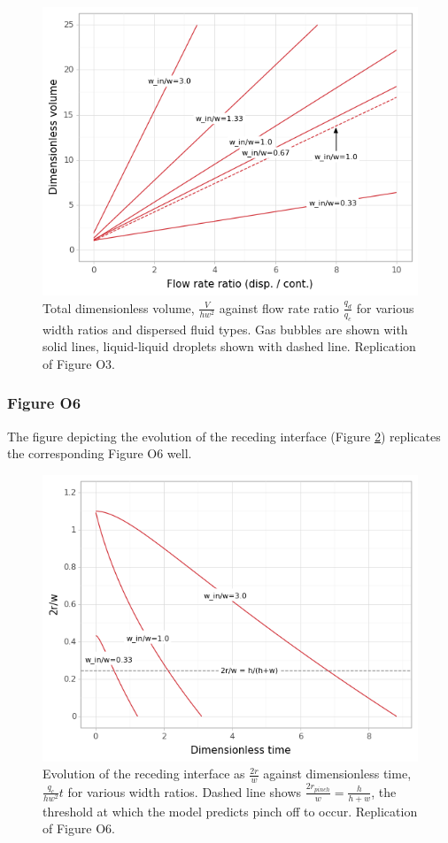 \begin{figure}[ht]
  \centering
  \includegraphics[width=0.8\linewidth]{../figures/fig_3.png}
  \caption{Total dimensionless volume, $\frac{V}{hw^2}$ against flow rate ratio $\frac{q_d}{q_c}$
  for various width ratios and dispersed fluid types. Gas bubbles are shown with solid lines, liquid-liquid droplets
  shown with dashed line. Replication of Figure O3.}
  \label{fig3}
\end{figure}

\subsubsection{Figure O6}

The figure depicting the evolution of the receding interface (Figure \ref{fig6}) replicates
the corresponding Figure O6 well.

\begin{figure}[!htb]
  \centering
  \includegraphics[width=0.8\linewidth]{../figures/fig_6.png}
  \caption{Evolution of the receding interface as $\frac{2r}{w}$ against dimensionless time,
  $\frac{q_c}{hw^2}t$ for various width ratios. Dashed line shows $\frac{2r_{pinch}}{w}=\frac{h}{h+w}$,
  the threshold at which the model predicts pinch off to occur.
  Replication of Figure O6.}
  \label{fig6}
\end{figure}


